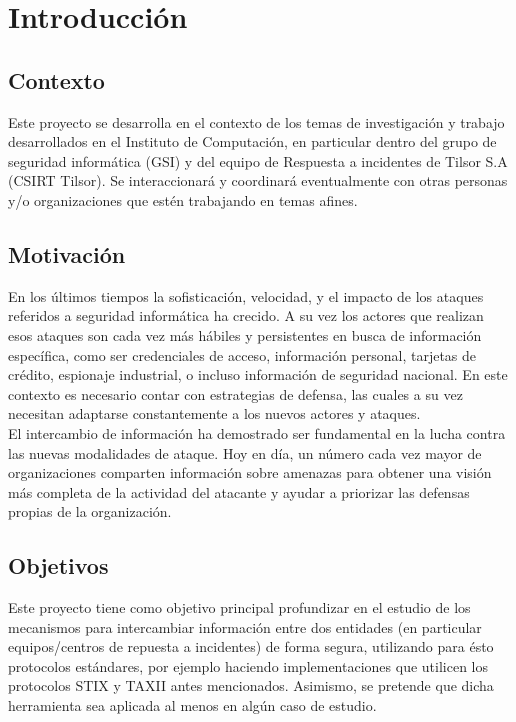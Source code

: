 \chapter{Introducción}
\label{capitulo1}


\section{Contexto}
\label{capitulo1:contexto}
Este proyecto se desarrolla en el contexto de los temas de investigación y trabajo desarrollados en el Instituto de Computación, en particular dentro del grupo de seguridad informática (GSI) y del equipo de Respuesta a incidentes de Tilsor S.A (CSIRT Tilsor). Se interaccionará y coordinará eventualmente con otras personas y/o organizaciones que estén trabajando en temas afines.

\section{Motivación}
\label{capitulo1:motivacion}
En los últimos tiempos la sofisticación, velocidad, y el impacto de los ataques referidos a seguridad informática ha crecido. A su vez  los actores que realizan esos ataques  son cada vez más hábiles y persistentes en busca de información específica, como ser credenciales de acceso, información personal, tarjetas de crédito, espionaje industrial, o incluso información de seguridad nacional. En este contexto es necesario contar con  estrategias de defensa, las cuales a su vez necesitan  adaptarse constantemente a los nuevos actores y ataques.\\

El intercambio de información ha demostrado ser fundamental en la lucha contra las nuevas modalidades de ataque. Hoy en día, un número cada vez mayor de organizaciones comparten  información sobre amenazas para obtener una visión más completa de la actividad del atacante y ayudar a priorizar las defensas propias de la organización.\\

\section{Objetivos}
\label{capitulo1:objetivos}
Este proyecto tiene como objetivo principal profundizar en el estudio de los mecanismos para intercambiar información entre dos entidades (en particular equipos/centros de repuesta a incidentes) de forma segura, utilizando para ésto protocolos estándares, por ejemplo haciendo implementaciones que utilicen  los protocolos STIX y TAXII antes mencionados. Asimismo, se pretende que dicha herramienta sea aplicada al menos en algún caso de estudio.

